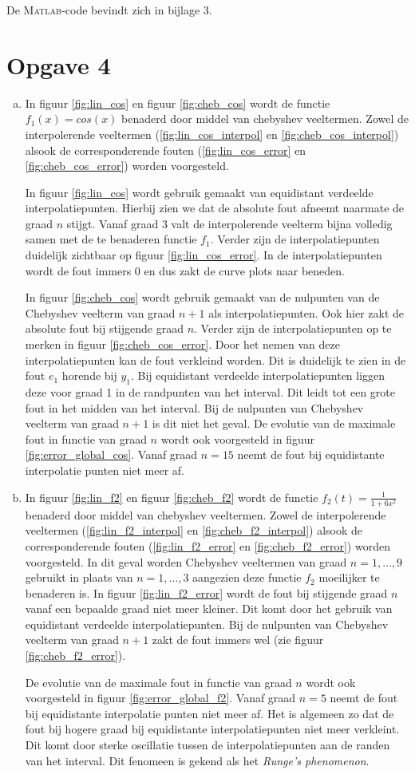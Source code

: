 \documentclass[a4paper]{article}
\newcommand{\opgave}[1]{\section*{Opgave #1}}
\begin{document}
De \textsc{Matlab}-code bevindt zich in bijlage 3.
\opgave{4}
\begin{enumerate}[a)] %
\item
In figuur \ref{fig:lin_cos} en figuur \ref{fig:cheb_cos} wordt de functie $f_{1}(x) = cos(x)$ benaderd door middel van chebyshev veeltermen. Zowel de interpolerende veeltermen  (\ref{fig:lin_cos_interpol} en \ref{fig:cheb_cos_interpol}) alsook de corresponderende fouten (\ref{fig:lin_cos_error} en \ref{fig:cheb_cos_error}) worden voorgesteld. 

In figuur \ref{fig:lin_cos} wordt gebruik gemaakt van equidistant verdeelde interpolatiepunten. Hierbij zien we dat de absolute fout afneemt naarmate de graad $n$ stijgt. Vanaf graad 3 valt de interpolerende veelterm bijna volledig samen met de te benaderen functie $f_{1}$. Verder zijn de interpolatiepunten duidelijk zichtbaar op figuur \ref{fig:lin_cos_error}. In de interpolatiepunten wordt de fout immers 0 en dus zakt de curve plots naar beneden.

In figuur \ref{fig:cheb_cos} wordt gebruik gemaakt van de nulpunten van de Chebyshev veelterm van graad $n+1$ als interpolatiepunten. Ook hier zakt de absolute fout bij stijgende graad $n$. Verder zijn de interpolatiepunten op te merken in figuur \ref{fig:cheb_cos_error}. Door het nemen van deze interpolatiepunten kan de fout verkleind worden. Dit is duidelijk te zien in de fout $e_{1}$ horende bij $y_{1}$. Bij equidistant verdeelde interpolatiepunten liggen deze voor graad 1 in de randpunten van het interval. Dit leidt tot een grote fout in het midden van het interval. Bij de nulpunten van Chebyshev veelterm van graad $n+1$ is dit niet het geval. De evolutie van de maximale fout in functie van graad $n$ wordt ook voorgesteld in figuur \ref{fig:error_global_cos}. Vanaf graad $n = 15$ neemt de fout bij equidistante interpolatie punten niet meer af.
\item
In figuur \ref{fig:lin_f2} en figuur \ref{fig:cheb_f2} wordt de functie $f_{2}(t) = \frac{1}{1+6x^{2}}$ benaderd door middel van chebyshev veeltermen. Zowel de interpolerende veeltermen  (\ref{fig:lin_f2_interpol} en \ref{fig:cheb_f2_interpol}) alsook de corresponderende fouten (\ref{fig:lin_f2_error} en \ref{fig:cheb_f2_error}) worden voorgesteld. In dit geval worden Chebyshev veeltermen van graad $n=1,\dots,9$ gebruikt in plaats van $n=1,\dots,3$ aangezien deze functie $f_{2}$ moeilijker te benaderen is. In figuur \ref{fig:lin_f2_error} wordt de fout bij stijgende graad $n$ vanaf een bepaalde graad niet meer kleiner. Dit komt door het gebruik van equidistant verdeelde interpolatiepunten. Bij de nulpunten van Chebyshev veelterm van graad $n+1$ zakt de fout immers wel (zie figuur \ref{fig:cheb_f2_error}). 

De evolutie van de maximale fout in functie van graad $n$ wordt ook voorgesteld in figuur \ref{fig:error_global_f2}. Vanaf graad $n=5$ neemt de fout bij equidistante interpolatie punten niet meer af. Het is algemeen zo dat de fout bij hogere graad bij equidistante interpolatiepunten niet meer verkleint. Dit komt door sterke oscillatie tussen de interpolatiepunten aan de randen van het interval. Dit fenomeen is gekend als het \textit{Runge's phenomenon}.
\end{enumerate}
\end{document}
